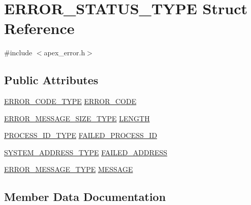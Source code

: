 \hypertarget{structERROR__STATUS__TYPE}{}\section{E\+R\+R\+O\+R\+\_\+\+S\+T\+A\+T\+U\+S\+\_\+\+T\+Y\+PE Struct Reference}
\label{structERROR__STATUS__TYPE}


{\ttfamily \#include $<$apex\+\_\+error.\+h$>$}

\subsection*{Public Attributes}
\begin{DoxyCompactItemize}
\item 
\hyperlink{apex__error_8h_a6c3334fe6390cd6a2e88e6a4aab5ffcc}{E\+R\+R\+O\+R\+\_\+\+C\+O\+D\+E\+\_\+\+T\+Y\+PE} \hyperlink{structERROR__STATUS__TYPE_a7e766892884aab7bc9830bc83bdfaa3b}{E\+R\+R\+O\+R\+\_\+\+C\+O\+DE}
\item 
\hyperlink{apex__error_8h_a0bec164d28637b1119fe1728e48262c2}{E\+R\+R\+O\+R\+\_\+\+M\+E\+S\+S\+A\+G\+E\+\_\+\+S\+I\+Z\+E\+\_\+\+T\+Y\+PE} \hyperlink{structERROR__STATUS__TYPE_a85fdbf6cbc8aaf3c4bcf7f05bf6ded21}{L\+E\+N\+G\+TH}
\item 
\hyperlink{apex__process_8h_a7a2c8e8d542c23599ac16fd978b241c4}{P\+R\+O\+C\+E\+S\+S\+\_\+\+I\+D\+\_\+\+T\+Y\+PE} \hyperlink{structERROR__STATUS__TYPE_a25a51bcff9ecdf57af3d59351c15503a}{F\+A\+I\+L\+E\+D\+\_\+\+P\+R\+O\+C\+E\+S\+S\+\_\+\+ID}
\item 
\hyperlink{apex__types_8h_afad87659fcb2bad73146a13b260290b9}{S\+Y\+S\+T\+E\+M\+\_\+\+A\+D\+D\+R\+E\+S\+S\+\_\+\+T\+Y\+PE} \hyperlink{structERROR__STATUS__TYPE_a24482299e857416957811845b37db84e}{F\+A\+I\+L\+E\+D\+\_\+\+A\+D\+D\+R\+E\+SS}
\item 
\hyperlink{apex__error_8h_a4b70f1f7793b79e3f25032ace3b04ff0}{E\+R\+R\+O\+R\+\_\+\+M\+E\+S\+S\+A\+G\+E\+\_\+\+T\+Y\+PE} \hyperlink{structERROR__STATUS__TYPE_a00202dd31a514e177d9bba92ee43d9d0}{M\+E\+S\+S\+A\+GE}
\end{DoxyCompactItemize}


\subsection{Member Data Documentation}
